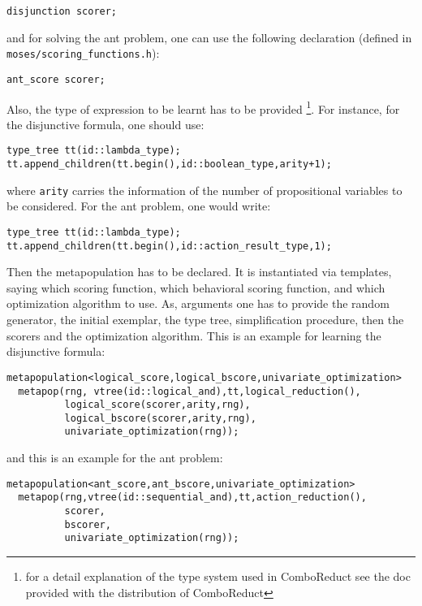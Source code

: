 \documentclass{article}
\begin{document}
\begin{verbatim}
disjunction scorer;
\end{verbatim}

\noindent 
and for solving the ant problem, one can use the following declaration 
(defined in \verb|moses/scoring_functions.h|):

\begin{verbatim}
ant_score scorer;
\end{verbatim}

Also, the type of expression to be learnt has to be provided 
\footnote{for a detail explanation of the type system used in ComboReduct
  see the doc provided with the distribution of ComboReduct}.
For instance, for the disjunctive formula, one should use:

\begin{verbatim}
type_tree tt(id::lambda_type);
tt.append_children(tt.begin(),id::boolean_type,arity+1);
\end{verbatim}

\noindent 
where \verb|arity| carries the information of the number of 
propositional variables to be considered. For the ant problem, 
one would write: 

\begin{verbatim}
type_tree tt(id::lambda_type);
tt.append_children(tt.begin(),id::action_result_type,1);
\end{verbatim}

Then the metapopulation has to be declared. It is instantiated
via templates, saying which scoring function, which behavioral scoring
function, and which optimization algorithm to use. As, arguments
one has to provide the random generator, the initial exemplar,
the type tree, simplification procedure, then the scorers and
the optimization algorithm. This is an example for learning
the disjunctive formula:

\begin{verbatim}
metapopulation<logical_score,logical_bscore,univariate_optimization> 
  metapop(rng, vtree(id::logical_and),tt,logical_reduction(),
          logical_score(scorer,arity,rng),
          logical_bscore(scorer,arity,rng),
          univariate_optimization(rng));
\end{verbatim}

\noindent 
and this is an example for the ant problem: 

\begin{verbatim}
metapopulation<ant_score,ant_bscore,univariate_optimization> 
  metapop(rng,vtree(id::sequential_and),tt,action_reduction(),
          scorer,
          bscorer,
          univariate_optimization(rng));
\end{verbatim}
\end{document}
